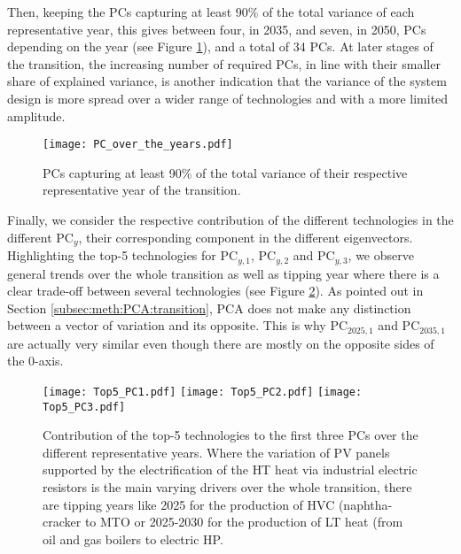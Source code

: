 Then, keeping the \gls{PCs} capturing at least 90\% of the total variance of each representative year, this gives between four, in 2035, and seven, in 2050, \gls{PCs} depending on the year (see Figure \ref{fig:PC_over_the_years}), and a total of 34 \gls{PCs}. At later stages of the transition, the increasing number of required \gls{PCs}, in line with their smaller share of explained variance, is another indication that the variance of the system design is more spread over a wider range of technologies and with a more limited amplitude. 

\begin{figure}[!htbp]
\centering
\texttt{[image: PC\_over\_the\_years.pdf]}
\caption{\gls{PCs} capturing at least 90\% of the total variance of their respective representative year of the transition. }
\label{fig:PC_over_the_years}
\end{figure}

Finally, we consider the respective contribution of the different technologies in the different $\text{PC}_{y}$, \ie their corresponding component in the different eigenvectors. Highlighting the top-5 technologies for $\text{PC}_{y,1}$, $\text{PC}_{y,2}$ and $\text{PC}_{y,3}$, we observe general trends over the whole transition as well as tipping year where there is a clear trade-off between several technologies (see Figure \ref{fig:Top5_PC_year}). As pointed out in Section \ref{subsec:meth:PCA:transition}, \gls{PCA} does not make any distinction between a vector of variation and its opposite. This is why $\text{PC}_{2025,1}$ and $\text{PC}_{2035,1}$ are actually very similar even though there are mostly on the opposite sides of the 0-axis.

\begin{figure}[!htbp]
\centering
\texttt{[image: Top5\_PC1.pdf]}
\texttt{[image: Top5\_PC2.pdf]}
\texttt{[image: Top5\_PC3.pdf]}
\caption{Contribution of the top-5 technologies to the first three \gls{PCs} over the different representative years. Where the variation of \gls{PV} panels supported by the electrification of the \gls{HT} heat via industrial electric resistors is the main varying drivers over the whole transition, there are tipping years like 2025 for the production of \gls{HVC} (\ie naphtha-cracker to \gls{MTO} or 2025-2030 for the production of \gls{LT} heat (\ie from oil and gas boilers to electric \gls{HP}.}
\label{fig:Top5_PC_year}
\end{figure}

